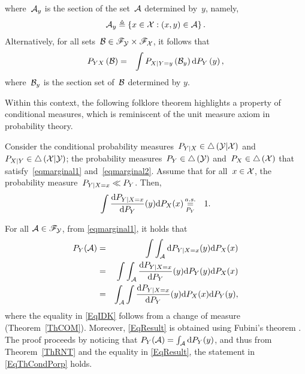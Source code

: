 \documentclass[lettersize,onecolumn]{IEEEtran}
\begin{document}
where~$\mathcal A_{y}$ is the section of the set~$\mathcal A$ determined by~$y$, namely, 
\begin{eqnarray}
\label{EqNovember15at16h39in2024InTheBusToNice}
\mathcal A_{y} \triangleq \left\lbrace x \in \mathcal X : (x,y) \in \mathcal A \right\rbrace.
\end{eqnarray}
Alternatively, for all sets~$\mathcal B \in \mathscr{F}_{\mathcal Y} \times \mathscr{F}_{\mathcal X}$, it follows that
\begin{eqnarray}
\label{EqNovember10at20h22in2024Nice}
P_{ YX } \left( \mathcal B \right) & = & \int P_{X | Y = y} \left( \mathcal B_{y}\right) \mathrm{d} P_{Y} \left( y\right),
\end{eqnarray}
where~$\mathcal B_{y}$ is the section set of~$\mathcal B$ determined by $y$.

Within this context, the following folklore theorem highlights a property of conditional measures, which is reminiscent of the unit measure axiom in probability theory. 
\begin{theorem}\label{ThUnitMeasure}
Consider the conditional probability measures~$P_{Y | X} \in \triangle\left( \mathcal Y | \mathcal X \right)$ and~$P_{X | Y}\in \triangle\left( \mathcal X | \mathcal Y \right)$; the probability measures~$P_{Y} \in \triangle\left( \mathcal Y \right)$ 
and~$P_{X} \in \triangle\left(  \mathcal X \right)$ that satisfy~\eqref{eqmarginal1} and~\eqref{eqmarginal2}. Assume that for all~$x \in \mathcal X$, the probability measure~${P_{Y | X = x}}\ll{P_{Y}}$. Then,
\begin{eqnarray}
\label{EqThCondPorp}
\int  \frac{\mathrm{d} P_{Y|X = x}}{\mathrm{d}P_{Y}} (y) \mathrm{d}P_{X}(x) &\displaystyle\mathop{ \stackrel{a.s.}{=}}_{P_Y}& 1.
 \end{eqnarray}
 \end{theorem}
% 
\begin{IEEEproof}
For all $\mathcal A \in \mathscr{F}_{\mathcal Y}$, from \eqref{eqmarginal1}, it holds that
\begin{eqnarray}
\label{EqDefOfMarg}
 P_{Y}(\mathcal A) & =& \int \int_{\mathcal A} \mathrm{d}P_{Y | X = x}(y) \mathrm{d}P_X (x)\\
 \label{EqIDK}
  & = & \int \int_{\mathcal A} \frac{\mathrm{d} P_{Y|X = x}}{\mathrm{d}P_{Y}}(y) \mathrm{d}P_{Y}(y) \mathrm{d}P_X (x)\\
  \label{EqResult}
  & =& \int_{\mathcal A} \int  \frac{\mathrm{d} P_{Y|X = x}}{\mathrm{d}P_{Y}}(y) \mathrm{d}P_X (x) \mathrm{d}P_{Y}(y),
 \end{eqnarray}
where the equality in  \eqref{EqIDK} follows from a change of measure (Theorem~\ref{ThCOM}). Moreover, \eqref{EqResult} is 
obtained using Fubini's theorem \cite[Theorem~2.6.6]{ash2000probability}.
The proof proceeds by noticing that $P_{Y}(\mathcal A)  =\int _{\mathcal A} \mathrm{d}P_{Y}(y)$, and thus from Theorem~\ref{ThRNT} and the equality in \eqref{EqResult}, the statement in \eqref{EqThCondPorp} holds.
\end{IEEEproof}
\end{document}
